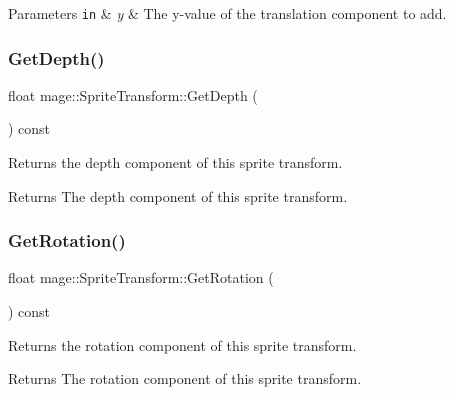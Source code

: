 \begin{DoxyParams}[1]{Parameters}
\mbox{\tt in}  & {\em y} & The y-\/value of the translation component to add. \\
\hline
\end{DoxyParams}
\hypertarget{structmage_1_1_sprite_transform_a9dfb5844abddaf3648f887f21db7077d}{}\label{structmage_1_1_sprite_transform_a9dfb5844abddaf3648f887f21db7077d} 
\subsubsection{\texorpdfstring{Get\+Depth()}{GetDepth()}}
{\footnotesize\ttfamily float mage\+::\+Sprite\+Transform\+::\+Get\+Depth (\begin{DoxyParamCaption}{ }\end{DoxyParamCaption}) const}

Returns the depth component of this sprite transform.

\begin{DoxyReturn}{Returns}
The depth component of this sprite transform. 
\end{DoxyReturn}
\hypertarget{structmage_1_1_sprite_transform_a1dda0fe10496d0d04a660c84d9a87efe}{}\label{structmage_1_1_sprite_transform_a1dda0fe10496d0d04a660c84d9a87efe} 
\subsubsection{\texorpdfstring{Get\+Rotation()}{GetRotation()}}
{\footnotesize\ttfamily float mage\+::\+Sprite\+Transform\+::\+Get\+Rotation (\begin{DoxyParamCaption}{ }\end{DoxyParamCaption}) const}

Returns the rotation component of this sprite transform.

\begin{DoxyReturn}{Returns}
The rotation component of this sprite transform. 
\end{DoxyReturn}
\hypertarget{structmage_1_1_sprite_transform_af3a00260c5346a32a9f81efcf0f48a6a}{}\label{structmage_1_1_sprite_transform_af3a00260c5346a32a9f81efcf0f48a6a} 
